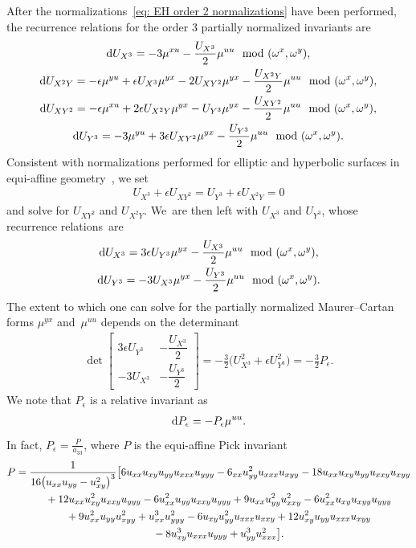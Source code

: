 \documentclass[10pt,a4paper]{amsart}
\numberwithin{equation}{section}
\begin{document}
After the normalizations~\eqref{eq: EH order 2 normalizations} have been performed, the recurrence relations for the order 3 partially normalized invariants
are
\begin{gather*}
{\rm d}U_{X^3}= -3 \mu^{xu} - \frac{U_{X^3}}{2}\mu^{uu} \mod (\omega^x,\omega^y),
\\
{\rm d}U_{X^2Y}= -\epsilon \mu^{yu}+\epsilon U_{X^3} \mu^{yx} -2U_{XY^2}\mu^{yx}-\frac{U_{X^2Y}}{2}\mu^{uu}\mod (\omega^x,\omega^y),
\\
{\rm d}U_{XY^2}= -\epsilon \mu^{xu} + 2\epsilon U_{X^2Y}\mu^{yx}-U_{Y^3}\mu^{yx} -\frac{U_{XY^2}}{2}\mu^{uu}\mod (\omega^x,\omega^y),
\\
{\rm d}U_{Y^3}= -3\mu^{yu}+3\epsilon U_{XY^2}\mu^{yx}-\frac{U_{Y^3}}{2}\mu^{uu}\mod (\omega^x,\omega^y).
\end{gather*}
Consistent with normalizations performed for elliptic and hyperbolic surfaces in equi-affine geo\-metry~\cite{O-2009diff}, we set
\begin{gather*}
U_{X^3}+\epsilon U_{XY^2} = U_{Y^3}+\epsilon U_{X^2Y}=0
\end{gather*}
and solve for $U_{XY^2}$ and $U_{X^2Y}$. We~are then left with $U_{X^3}$ and $U_{Y^3}$, whose recurrence rela\-tions~are
\begin{gather*}
{\rm d}U_{X^3} =3\epsilon U_{Y^3}\mu^{yx} - \frac{U_{X^3}}{2}\mu^{uu} \mod(\omega^x,\omega^y),
\\
{\rm d}U_{Y^3} = -3U_{X^3}\mu^{yx} - \frac{U_{Y^3}}{2}\mu^{uu} \mod(\omega^x,\omega^y).
\end{gather*}
The extent to which one can solve for the partially normalized Maurer--Cartan forms $\mu^{yx}$ and~$\mu^{uu}$ depends on the determinant
\begin{gather*}
\det \begin{bmatrix}
3\epsilon U_{Y^3} & - \dfrac{U_{X^3}}{2} \\[1.5ex]
-3U_{X^3} & - \dfrac{U_{Y^3}}{2}
\end{bmatrix} = -\frac{3}{2} \big(U_{X^3}^2+ \epsilon U_{Y^3}^2\big) = - \frac{3}{2} P_\epsilon.
\end{gather*}
We note that $P_\epsilon$ is a relative invariant as
\begin{gather*}
{\rm d}P_\epsilon = -P_\epsilon \mu^{uu}.
\end{gather*}
In fact, $P_\epsilon=\frac{P}{a_{33}}$, where $P$ is the equi-affine Pick invariant
%
\begin{gather*}
P =\frac{1}{16 \big(u_{xx} u_{yy}-u_{xy}^2\big)^3}\big[6 u_{xx}u_{xy} u_{yy} u_{xxx}u_{yyy}-6_{xx}u_{yy}^2 u_{xxx} u_{xyy} -18 u_{xx}u_{xy} u_{yy} u_{xxy} u_{xyy}
\\ \hphantom{P =}
{}+12 u_{xx}u_{xy}^2 u_{xxy} u_{yyy}-6 u_{xx}^2u_{yy} u_{xxy}u_{yyy}+9 u_{xx}u_{yy}^2 u_{xxy}^2 -6
 u_{xx}^2 u_{xy} u_{xyy} u_{yyy}
\\ \hphantom{P =}
{}+9 u_{xx}^2 u_{yy} u_{xyy}^2 +u_{xx}^3 u_{yyy}^2-6u_{xy} u_{yy}^2 u_{xxx} u_{xxy} +12 u_{xy}^2 u_{yy} u_{xxx} u_{xyy}
\\ \hphantom{P =}
{}-8 u_{xy}^3 u_{xxx} u_{yyy} + u_{yy}^3 u_{xxx}^2 \big].
\end{gather*}
\end{document}
